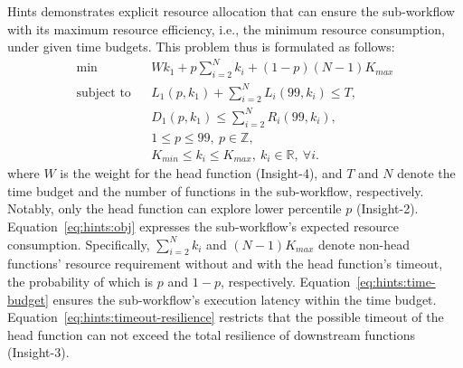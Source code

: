Hints demonstrates explicit resource allocation that can ensure the sub-workflow with its maximum resource efficiency, i.e., the minimum resource consumption, under given time budgets.
This problem thus is formulated as follows:
\begin{eqnarray}
	\min && W k_1+p  \sum_{i=2}^{N}k_i +(1-p) (N-1) K_{max} \label{eq:hints:obj}\\
	\text{subject to} &&
 L_1(p,k_1)+\sum_{i=2}^{N}L_i(99,k_i) \leq T, \label{eq:hints:time-budget}\\
&& D_1(p,k_1) \leq \sum_{i=2}^{N}R_i(99,k_i), \label{eq:hints:timeout-resilience}\\
&&  1 \leq p \leq 99,~p \in \mathbb{Z},\\
&& K_{min}\leq k_i \leq K_{max},~k_i \in \mathbb{R}, ~\forall i.
\end{eqnarray}
where $W$ is the weight for the head function (Insight-4), and $T$ and $N$ denote the time budget and the number of functions in the sub-workflow, respectively.
Notably, only the head function can explore lower percentile $p$ (Insight-2).
Equation~\ref{eq:hints:obj} expresses the sub-workflow's expected resource consumption.
Specifically, $\sum_{i=2}^{N}k_i$ and $(N-1)K_{max}$ denote non-head functions' resource requirement without and with the head function's timeout, the probability of which is $p$ and $1-p$, respectively.
Equation~\ref{eq:hints:time-budget} ensures the sub-workflow's execution latency within the time budget.
Equation~\ref{eq:hints:timeout-resilience} restricts that the possible timeout of the head function can not exceed the total resilience of downstream functions (Insight-3).

